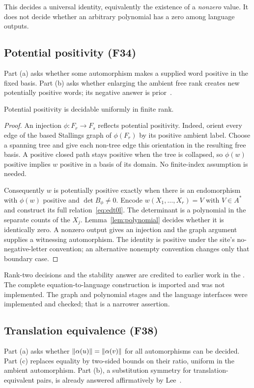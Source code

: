 This decides a universal identity, equivalently the existence of a
\emph{nonzero} value. It does not decide whether an arbitrary polynomial
has a zero among language outputs.

\subsection{Potential positivity (F34)}\label{sec:f34}
Part (a) asks whether some automorphism makes a supplied word positive
in the fixed basis. Part (b) asks whether enlarging the ambient free
rank creates new potentially positive words; its negative answer is prior~\cite{clark-goldstein}.

\begin{theorem}
Potential positivity is decidable uniformly in finite rank.
\end{theorem}
\begin{proof}
An injection $\phi:F_r\to F_s$ reflects potential positivity. Indeed,
orient every edge of the based Stallings graph of $\phi(F_r)$ by its
positive ambient label. Choose a spanning tree and give each non-tree
edge this orientation in the resulting free basis. A positive closed
path stays positive when the tree is collapsed, so $\phi(w)$ positive
implies $w$ positive in a basis of its domain. No finite-index assumption
is needed.

Consequently $w$ is potentially positive exactly when there is an
endomorphism with $\phi(w)$ positive and $\det B_\phi\ne0$.
Encode $w(X_1,\ldots,X_r)=V$ with $V\in A^*$ and construct its
full relation~\eqref{eq:edt0l}. The determinant is a polynomial in
the separate counts of the $X_j$. Lemma~\ref{lem:polynomial} decides
whether it is identically zero. A nonzero output gives an injection
and the graph argument supplies a witnessing automorphism.
The identity is positive under the site's no-negative-letter convention;
an alternative nonempty convention changes only that boundary case.
\end{proof}

Rank-two decisions and the stability answer are credited to earlier
work in the .
The complete equation-to-language construction is imported and was not
implemented. The graph and polynomial stages and the language interfaces
were implemented and checked; that is a narrower assertion.

\subsection{Translation equivalence (F38)}\label{sec:f38}
Part (a) asks whether $\lVert \alpha(u)\rVert=\lVert \alpha(v)\rVert$ for
all automorphisms can be decided. Part (c) replaces equality by
two-sided bounds on their ratio, uniform in the ambient automorphism.
Part (b), a substitution symmetry for translation-equivalent pairs,
is already answered affirmatively by Lee~\cite{lee-substitution}.


